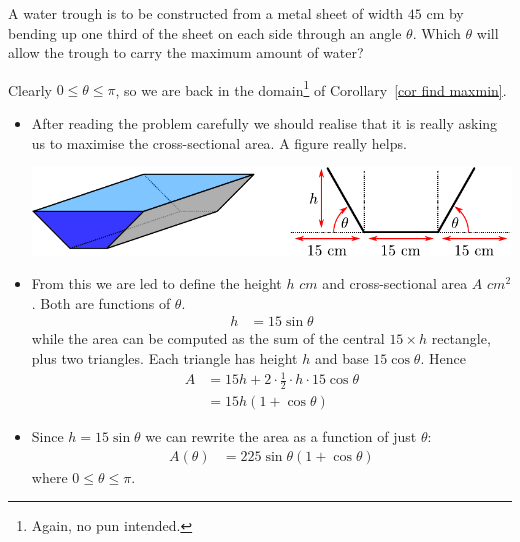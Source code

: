 \begin{eg}\label{APPglobalMaxMinrain}
A water trough is to be constructed from a metal sheet of width $45$ cm
by bending up one third of the sheet on each side through an angle
$\theta$.  Which $\theta$ will allow the trough to carry the maximum
amount of water?


\soln Clearly $0 \leq \theta \leq \pi$, so we are back in the domain\footnote{Again, no
pun intended.} of Corollary~\ref{cor find maxmin}.
\begin{itemize}
 \item After reading the problem carefully we should realise that it is really asking us
to maximise the cross-sectional area. A figure really helps.

\begin{efig}
\begin{center}
   \includegraphics{extra/gutter}
\end{center}
\end{efig}

\item From this we are led to define the height $h$ $cm$ and cross-sectional area $A$
$cm^2$. Both are functions of $\theta$.
\begin{align*}
  h &= 15 \sin \theta
\end{align*}
while the area can be computed as the sum of the central $15 \times h$ rectangle, plus
two triangles. Each triangle has height $h$ and base $15 \cos \theta$. Hence
\begin{align*}
  A &= 15h + 2 \cdot \frac{1}{2} \cdot h \cdot 15 \cos \theta \\
  &= 15h \left(1 + \cos \theta \right)
\end{align*}
\item Since $h = 15\sin \theta$ we can rewrite the area as a function of just $\theta$:
\begin{align*}
  A(\theta) &= 225 \sin\theta \left(1 + \cos \theta \right)
\end{align*}
where $0 \leq \theta \leq \pi$.


\end{itemize}
\end{eg}

